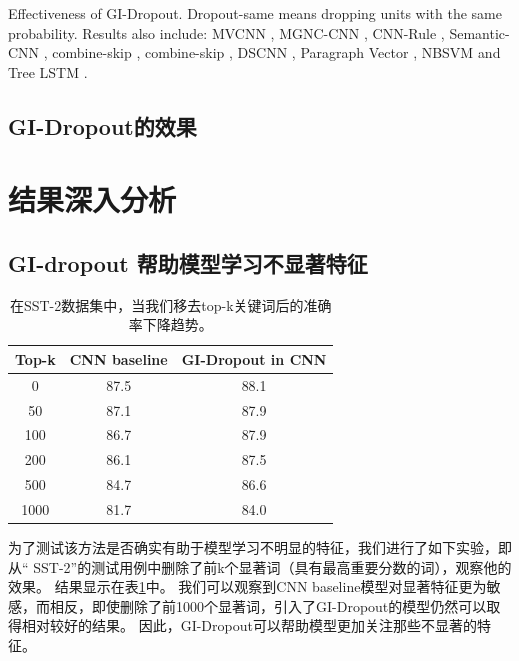 \begin{table}[t]
\begin{small}
\caption{Effectiveness of GI-Dropout.
Dropout-same means dropping units with the same probability.
Results also include: MVCNN \cite{yin2015multichannel}, MGNC-CNN \cite{zhang2016mgnc}, CNN-Rule \cite{hu2016harnessing}, Semantic-CNN \cite{li2017initializing}, combine-skip \cite{kiros2015skip}, combine-skip \cite{kiros2015skip}, DSCNN \cite{zhang2016dependency}, Paragraph Vector \cite{le2014distributed}, NBSVM \cite{wang2012baselines} and Tree LSTM \cite{tai2015improved}.
}

\label{table: result}
\qquad

\end{small}
\end{table}


\subsection{GI-Dropout的效果}

\section{结果深入分析}

\subsection{GI-dropout 帮助模型学习不显著特征}
\begin{table}[!t]
\centering
\begin{tabular}{c | c c}
\hline
\bfseries Top-k &  CNN baseline &  GI-Dropout in CNN\\
\hline
0 & 87.5 & 88.1  \\
50 & 87.1 & 87.9  \\
100 & 86.7 & 87.9  \\
200 & 86.1 & 87.5  \\
500 & 84.7 & 86.6  \\
1000 & 81.7 & 84.0 \\

\hline
\hline
\end{tabular}
\caption{在SST-2数据集中，当我们移去top-k关键词后的准确率下降趋势。}
\label{table: decline-SST-2}
\end{table}
为了测试该方法是否确实有助于模型学习不明显的特征，我们进行了如下实验，即从“ SST-2”的测试用例中删除了前k个显著词（具有最高重要分数的词），观察他的效果。
结果显示在表\ref{table: decline-SST-2}中。
我们可以观察到CNN baseline模型对显著特征更为敏感，而相反，即使删除了前1000个显著词，引入了GI-Dropout的模型仍然可以取得相对较好的结果。
因此，GI-Dropout可以帮助模型更加关注那些不显著的特征。


